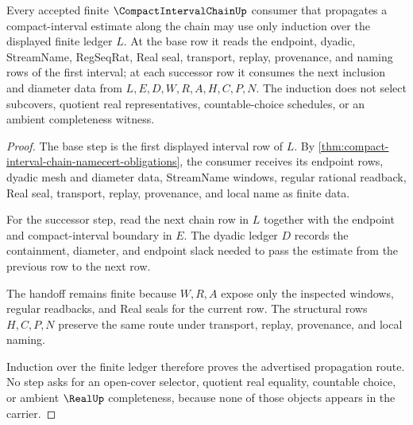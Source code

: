 \begin{theorem}
\label{thm:compact-interval-chain-finite-cover-induction}
Every accepted finite $\CompactIntervalChainUp$ consumer that propagates a compact-interval estimate along the chain may use only induction over the displayed finite ledger $L$. At the base row it reads the endpoint, dyadic, StreamName, RegSeqRat, Real seal, transport, replay, provenance, and naming rows of the first interval; at each successor row it consumes the next inclusion and diameter data from $L,E,D,W,R,A,H,C,P,N$. The induction does not select subcovers, quotient real representatives, countable-choice schedules, or an ambient completeness witness.
\end{theorem}
\begin{proof}
The base step is the first displayed interval row of $L$. By \autoref{thm:compact-interval-chain-namecert-obligations}, the consumer receives its endpoint rows, dyadic mesh and diameter data, StreamName windows, regular rational readback, Real seal, transport, replay, provenance, and local name as finite data.

For the successor step, read the next chain row in $L$ together with the endpoint and compact-interval boundary in $E$. The dyadic ledger $D$ records the containment, diameter, and endpoint slack needed to pass the estimate from the previous row to the next row.

The handoff remains finite because $W,R,A$ expose only the inspected windows, regular readbacks, and Real seals for the current row. The structural rows $H,C,P,N$ preserve the same route under transport, replay, provenance, and local naming.

Induction over the finite ledger therefore proves the advertised propagation route. No step asks for an open-cover selector, quotient real equality, countable choice, or ambient $\RealUp$ completeness, because none of those objects appears in the carrier.
\end{proof}




